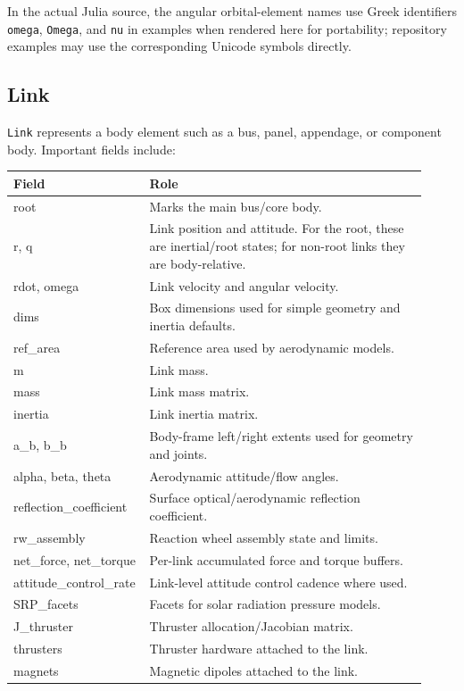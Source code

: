 \documentclass[11pt]{article}
\begin{document}
In the actual Julia source, the angular orbital-element names use Greek
identifiers \texttt{omega}, \texttt{Omega}, and \texttt{nu} in examples when
rendered here for portability; repository examples may use the corresponding
Unicode symbols directly.

\subsection{Link}

\texttt{Link} represents a body element such as a bus, panel, appendage, or
component body. Important fields include:

\begin{longtable}{>{\ttfamily}p{0.26\linewidth}p{0.66\linewidth}}
\textbf{Field} & \textbf{Role} \\
\hline
root & Marks the main bus/core body. \\
r, q & Link position and attitude. For the root, these are inertial/root states; for non-root links they are body-relative. \\
rdot, omega & Link velocity and angular velocity. \\
dims & Box dimensions used for simple geometry and inertia defaults. \\
ref\_area & Reference area used by aerodynamic models. \\
m & Link mass. \\
mass & Link mass matrix. \\
inertia & Link inertia matrix. \\
a\_b, b\_b & Body-frame left/right extents used for geometry and joints. \\
alpha, beta, theta & Aerodynamic attitude/flow angles. \\
reflection\_coefficient & Surface optical/aerodynamic reflection coefficient. \\
rw\_assembly & Reaction wheel assembly state and limits. \\
net\_force, net\_torque & Per-link accumulated force and torque buffers. \\
attitude\_control\_rate & Link-level attitude control cadence where used. \\
SRP\_facets & Facets for solar radiation pressure models. \\
J\_thruster & Thruster allocation/Jacobian matrix. \\
thrusters & Thruster hardware attached to the link. \\
magnets & Magnetic dipoles attached to the link. \\
\end{longtable}
\end{document}
